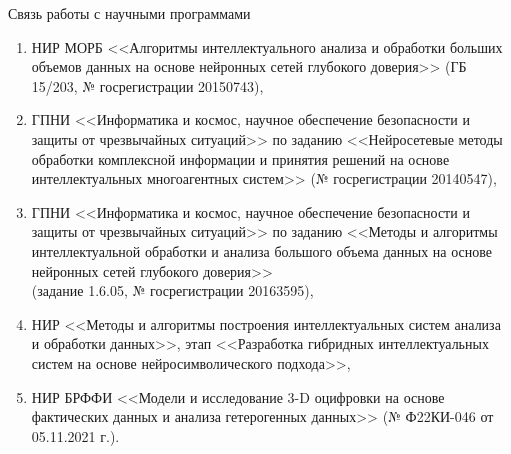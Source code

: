\documentclass[10pt]{beamer}
\begin{document}
        \begin{frame}{Связь работы с научными программами}
            \begin{enumerate}
                \item НИР МОРБ <<Алгоритмы интеллектуального анализа и обработки больших объемов данных на основе нейронных сетей глубокого доверия>> (ГБ 15/203, № госрегистрации 20150743),
                \item ГПНИ <<Информатика и космос, научное обеспечение безопасности и защиты от чрезвычайных ситуаций>> по заданию <<Нейросетевые методы обработки комплексной информации и принятия решений на основе интеллектуальных многоагентных систем>> (№ госрегистрации 20140547),
                \item ГПНИ <<Информатика и космос, научное обеспечение безопасности и защиты от чрезвычайных ситуаций>> по заданию <<Методы и алгоритмы интеллектуальной обработки и анализа большого объема данных на основе нейронных сетей глубокого доверия>>\\ (задание 1.6.05, № госрегистрации 20163595),
                \item НИР <<Методы и алгоритмы построения интеллектуальных систем анализа и обработки данных>>, этап <<Разработка гибридных интеллектуальных систем на основе нейросимволического подхода>>,
                \item НИР БРФФИ <<Модели и исследование 3-D оцифровки на основе фактических данных и анализа гетерогенных данных>> (№ Ф22КИ-046 от 05.11.2021 г.).
            \end{enumerate}
        \end{frame}
\end{document}
